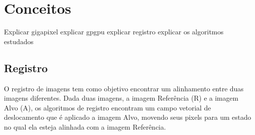 \chapter{Conceitos}
\label{cap:conceitos}



Explicar gigapixel
explicar gpgpu
explicar registro
explicar os algoritmos estudados

\section{Registro}
\label{sec:fundamentos}

    O registro de imagens tem como objetivo encontrar um alinhamento entre duas imagens diferentes. Dada duas imagens, 
a imagem Referência (R) e a imagem Alvo (A), os algoritmos de registro encontram um campo
vetorial de deslocamento que é aplicado a imagem Alvo, movendo seus pixels para um estado no qual ela esteja alinhada
com a imagem Referência.



